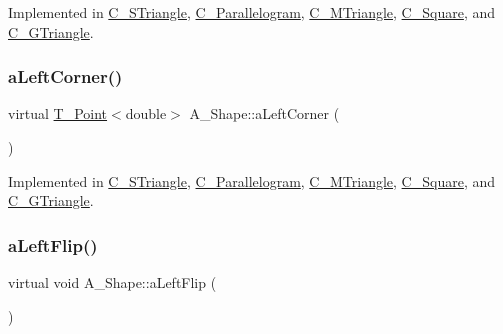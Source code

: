 Implemented in \hyperlink{classC__STriangle_a3bc82d7ea53a6a058b9fb49bbd89282c}{C\+\_\+\+S\+Triangle}, \hyperlink{classC__Parallelogram_a9ccee396c30606bfe64df416c22586d5}{C\+\_\+\+Parallelogram}, \hyperlink{classC__MTriangle_ae29e4f6608a0079507c6397b3dbef246}{C\+\_\+\+M\+Triangle}, \hyperlink{classC__Square_ac5ffad4afca051f117b43012fb4dc239}{C\+\_\+\+Square}, and \hyperlink{classC__GTriangle_a417b28c74dd35f81a19b5bd1d214ba8d}{C\+\_\+\+G\+Triangle}.

\mbox{\label{classA__Shape_abe6781b13037bf7ecea8ff9456b31533}} 
\subsubsection{\texorpdfstring{a\+Left\+Corner()}{aLeftCorner()}}
{\footnotesize\ttfamily virtual \hyperlink{classT__Point}{T\+\_\+\+Point}$<$double$>$ A\+\_\+\+Shape\+::a\+Left\+Corner (\begin{DoxyParamCaption}{ }\end{DoxyParamCaption})\hspace{0.3cm}{\ttfamily [pure virtual]}}



Implemented in \hyperlink{classC__STriangle_a8e580f80693ea6f66cca3782ced8e301}{C\+\_\+\+S\+Triangle}, \hyperlink{classC__Parallelogram_a260c557810c63dd97f2dd64bc15b9dc8}{C\+\_\+\+Parallelogram}, \hyperlink{classC__MTriangle_ad077fce026711bf0a25fc4c1cb83ecb9}{C\+\_\+\+M\+Triangle}, \hyperlink{classC__Square_a13e97bb379f1678636e3baf781c2a01b}{C\+\_\+\+Square}, and \hyperlink{classC__GTriangle_a57943afaad0f6b7c3c13aa35a233e93b}{C\+\_\+\+G\+Triangle}.

\mbox{\label{classA__Shape_abe947e7003cb63be2b4f6c439533427d}} 
\subsubsection{\texorpdfstring{a\+Left\+Flip()}{aLeftFlip()}}
{\footnotesize\ttfamily virtual void A\+\_\+\+Shape\+::a\+Left\+Flip (\begin{DoxyParamCaption}{ }\end{DoxyParamCaption})\hspace{0.3cm}{\ttfamily [pure virtual]}}



